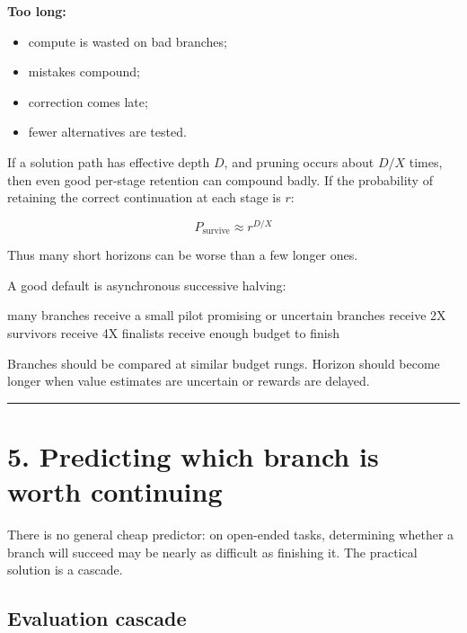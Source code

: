 \documentclass[
  letterpaper,
]{article}
\newenvironment{Shaded}{}{}
\newcommand{\NormalTok}[1]{#1}
\providecommand{\tightlist}{%
  \setlength{\itemsep}{0pt}\setlength{\parskip}{0pt}}
\begin{document}
\textbf{Too long:}

\begin{itemize}
\tightlist
\item
  compute is wasted on bad branches;
\item
  mistakes compound;
\item
  correction comes late;
\item
  fewer alternatives are tested.
\end{itemize}

If a solution path has effective depth \(D\), and pruning occurs about \(D/X\) times, then even good per-stage retention can compound badly. If the probability of retaining the correct continuation at each stage is \(r\):

\[
P_{\text{survive}}\approx r^{D/X}
\]

Thus many short horizons can be worse than a few longer ones.

A good default is asynchronous successive halving:

\begin{Shaded}
\begin{Highlighting}[]
\NormalTok{many branches receive a small pilot}
\NormalTok{promising or uncertain branches receive 2X}
\NormalTok{survivors receive 4X}
\NormalTok{finalists receive enough budget to finish}
\end{Highlighting}
\end{Shaded}

Branches should be compared at similar budget rungs. Horizon should become longer when value estimates are uncertain or rewards are delayed.

\begin{center}\rule{0.5\linewidth}{0.5pt}\end{center}

\section{5. Predicting which branch is worth continuing}\label{predicting-which-branch-is-worth-continuing}

There is no general cheap predictor: on open-ended tasks, determining whether a branch will succeed may be nearly as difficult as finishing it. The practical solution is a cascade.

\subsection{Evaluation cascade}\label{evaluation-cascade}
\end{document}
